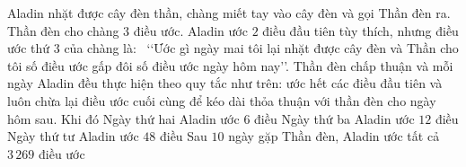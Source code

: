 
\begin{ex}%
	Aladin nhặt được cây đèn thần, chàng miết tay vào cây đèn và gọi Thần đèn ra. Thần đèn cho chàng $3$ điều ước. Aladin ước $2$ điều đầu tiên tùy thích, nhưng điều ước thứ $3$ của chàng là: \, \lq\lq Ước gì ngày mai tôi lại  nhặt được cây đèn và Thần cho tôi số điều ước gấp đôi số điều ước ngày hôm nay\rq\rq. Thần đèn chấp thuận và mỗi ngày Aladin đều thực hiện theo quy tắc như trên: ước hết các điều đầu tiên và luôn chừa lại điều ước cuối cùng để kéo dài thỏa thuận với thần đèn cho ngày hôm sau. Khi đó
	\choiceTF 
		 {\True Ngày thứ hai Aladin ước $6$ điều}
		{\True Ngày thứ ba  Aladin ước $12$ điều}
		{Ngày thứ tư Aladin  ước $48$ điều}
		{Sau $10$ ngày  gặp Thần đèn, Aladin ước tất cả $3\,269$ điều ước}
\end{ex}

